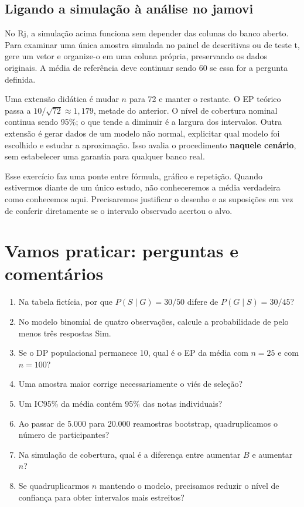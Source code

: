 \subsection{Ligando a simulação à análise no jamovi}

No Rj, a simulação acima funciona sem depender das colunas do banco aberto. Para examinar uma única amostra simulada no painel de descritivas ou de teste t, gere um vetor e organize-o em uma coluna própria, preservando os dados originais. A média de referência deve continuar sendo 60 se essa for a pergunta definida.

Uma extensão didática é mudar $n$ para 72 e manter o restante. O EP teórico passa a $10/\sqrt{72}\approx1{,}179$, metade do anterior. O nível de cobertura nominal continua sendo 95\%; o que tende a diminuir é a largura dos intervalos. Outra extensão é gerar dados de um modelo não normal, explicitar qual modelo foi escolhido e estudar a aproximação. Isso avalia o procedimento \textbf{naquele cenário}, sem estabelecer uma garantia para qualquer banco real.

Esse exercício faz uma ponte entre fórmula, gráfico e repetição. Quando estivermos diante de um único estudo, não conheceremos a média verdadeira como conhecemos aqui. Precisaremos justificar o desenho e as suposições em vez de conferir diretamente se o intervalo observado acertou o alvo.

\section{Vamos praticar: perguntas e comentários}

\begin{enumerate}
  \item Na tabela fictícia, por que $P(S\mid G)=30/50$ difere de $P(G\mid S)=30/45$?
  \item No modelo binomial de quatro observações, calcule a probabilidade de pelo menos três respostas Sim.
  \item Se o DP populacional permanece 10, qual é o EP da média com $n=25$ e com $n=100$?
  \item Uma amostra maior corrige necessariamente o viés de seleção?
  \item Um IC95\% da média contém 95\% das notas individuais?
  \item Ao passar de 5.000 para 20.000 reamostras bootstrap, quadruplicamos o número de participantes?
  \item Na simulação de cobertura, qual é a diferença entre aumentar $B$ e aumentar $n$?
  \item Se quadruplicarmos $n$ mantendo o modelo, precisamos reduzir o nível de confiança para obter intervalos mais estreitos?
\end{enumerate}

